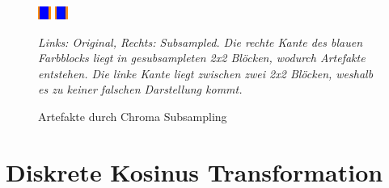 \begin{figure}[h!]
    \centering
    \includegraphics[scale=10]{images/2-1_chroma_artefacts_original.png}
    \includegraphics[scale=10]{images/2-1_chroma_artefacts_sampled.png}
    \caption{Artefakte durch Chroma Subsampling}
    \textit{Links: Original, Rechts: Subsampled. Die rechte Kante des blauen Farbblocks liegt in gesubsampleten 2x2 Blöcken, wodurch Artefakte entstehen. Die linke Kante liegt zwischen zwei 2x2 Blöcken, weshalb es zu keiner falschen Darstellung kommt.}
    \label{fig:chroma_artefacts}
\end{figure}





\section{Diskrete Kosinus Transformation}




